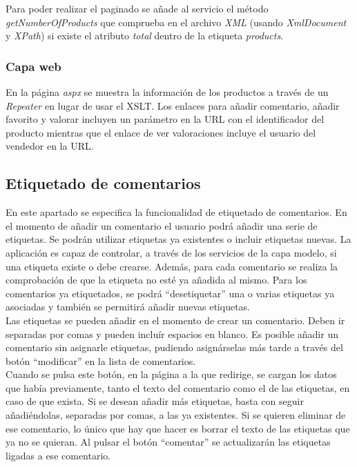 \documentclass{article}
\begin{document}
	Para poder realizar el paginado se añade al servicio el método \emph{getNumberOfProducts} que comprueba en el archivo \emph{XML} (usando \emph{XmlDocument} y \emph{XPath}) si existe el atributo \emph{total} dentro de la etiqueta \emph{products}.

\subsubsection{Capa web}
	En la página \emph{aspx} se muestra la información de los productos a través de un 
\emph{Repeater} en lugar de usar el XSLT.
	Los enlaces para añadir comentario, añadir favorito y valorar incluyen un parámetro en la URL con el identificador del producto mientras que el enlace de ver valoraciones incluye el usuario del vendedor en la URL.
\subsection{Etiquetado de comentarios}

	En este apartado se especifica la funcionalidad de etiquetado de comentarios. En el momento de añadir un comentario el usuario podrá añadir una 
	serie de etiquetas. Se podrán utilizar etiquetas ya existentes o incluir etiquetas nuevas. La aplicación es capaz de controlar, a través de los 
	servicios de la capa modelo, si una etiqueta existe o debe crearse. Además, para cada comentario se realiza la comprobación de que la etiqueta no 
	esté ya añadida al mismo. Para los comentarios ya etiquetados, se podrá ``desetiquetar'' una o varias etiquetas ya asociadas y también se permitirá
	añadir nuevas etiquetas.\\
	
	Las etiquetas se pueden añadir en el momento de crear un comentario. Deben ir separadas por comas y pueden incluír espacios en blanco. Es posible
	añadir un comentario sin asignarle etiquetas, pudiendo asignárselas más tarde a través del botón ``modificar'' en la lista de comentarios. \\Cuando
	se pulsa este botón, en la página a la que redirige, se cargan los datos que había previamente, tanto el texto del comentario como el de las etiquetas,
	en caso de que exista. Si se desean añadir más etiquetas, basta con seguir añadiéndolas, separadas por comas, a las ya existentes. Si se quieren
	eliminar de ese comentario, lo único que hay que hacer es borrar el texto de las etiquetas que ya no se quieran. Al pulsar el botón ``comentar'' se
	actualizarán las etiquetas ligadas a ese comentario.
	
\end{document}
